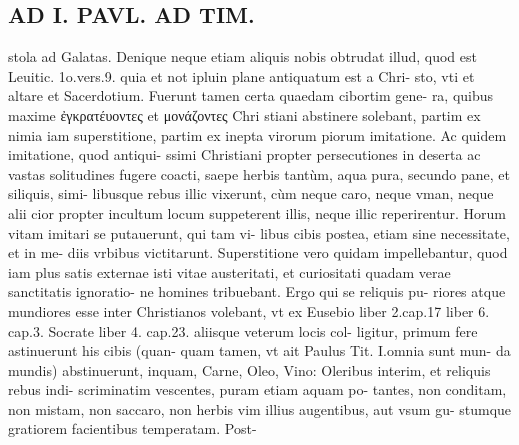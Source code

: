 \documentclass{article}
\begin{document}
\begin{pages}
\section*{AD I. PAVL. AD TIM. }
\marginpar{[ p.370 ]}\pstart stola ad Galatas. Denique neque etiam aliquis nobis obtrudat illud, quod est Leuitic. 1o.vers.9. quia et not ipluin plane antiquatum est a Chri- sto, vti et altare et Sacerdotium.  \pend\pstart Fuerunt tamen certa quaedam cibortim gene- ra, quibus maxime ἐγκρατέυοντες et μονάζοντες Chri stiani abstinere solebant, partim ex nimia iam superstitione, partim ex inepta virorum piorum imitatione. Ac quidem imitatione, quod antiqui- ssimi Christiani propter persecutiones in deserta ac vastas solitudines fugere coacti, saepe herbis tantùm, aqua pura, secundo pane, et siliquis, simi- libusque rebus illic vixerunt, cùm neque caro, neque vman, neque alii cior propter incultum locum suppeterent illis, neque illic reperirentur. Horum vitam imitari se putauerunt, qui tam vi- libus cibis postea, etiam sine necessitate, et in me- diis vrbibus victitarunt.  \pend\pstart Superstitione vero quidam impellebantur, quod iam plus satis externae isti vitae austeritati, et curiositati quadam verae sanctitatis ignoratio- ne homines tribuebant. Ergo qui se reliquis pu- riores atque mundiores esse inter Christianos volebant, vt ex Eusebio liber 2.cap.17 liber  6. cap.3. Socrate liber  4. cap.23. aliisque veterum locis col- ligitur, primum fere astinuerunt his cibis (quan- quam tamen, vt ait Paulus Tit. I.omnia sunt mun- da mundis) abstinuerunt, inquam, Carne, Oleo, Vino: Oleribus interim, et reliquis rebus indi- scriminatim vescentes, puram etiam aquam po- tantes, non conditam, non mistam, non saccaro, non herbis vim illius augentibus, aut vsum gu- stumque  gratiorem facientibus temperatam. Post-  \pend

\end{pages}
\end{document}
